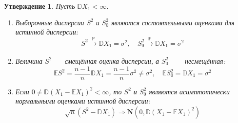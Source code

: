 \documentclass[oneside,final,14pt]{extreport}
\theoremstyle{plain}
\newtheorem*{thm*}{Утверждение}
\theoremstyle{definition}
\theoremstyle{named}
\begin{document}
\begin{thm*}
Пусть $\mathbb{D} X_{1}<\infty$.
\begin{enumerate}
    \item Выборочные дисперсии $S^{2}$ и $S^{2}_0$ являются состоятельными оценками для истинной дисперсии:
    \begin{equation*}
        S^{2} \xrightarrow[]{\mathbb{P}} \mathbb{D} X_{1}=\sigma^{2}, \quad S_{0}^{2} \xrightarrow[]{\mathbb{P}} \mathbb{D} X_{1}=\sigma^{2}
    \end{equation*}
    \item Величина $S^{2}$~--- смещённая оценка дисперсии, а $S^{2}_0$~--— несмещённая:
    \begin{equation*}
        \mathbb{E} S^{2}=\frac{n-1}{n} \mathbb{D} X_{1}=\frac{n-1}{n} \sigma^{2} \neq \sigma^{2}, \quad \mathbb{E} S_{0}^{2}=\mathbb{D} X_{1}=\sigma^{2}
    \end{equation*}
    
    \item Если $0 \neq \mathbb{D}(X_{1}-\mathbb{E}X_{1})^{2}<\infty$, то $S^{2}$ и $S^{2}_0$ являются асимптотически нормальными оценками истинной дисперсии:
    \begin{equation*}
        \sqrt{n}\left(S^{2}-\mathbb{D} X_{1}\right) \Rightarrow \mathbf{N}(0, \mathbb{D}(X_{1}-\mathbb{E} X_{1})^{2})
    \end{equation*}
\end{enumerate}
\end{thm*}
\end{document}
